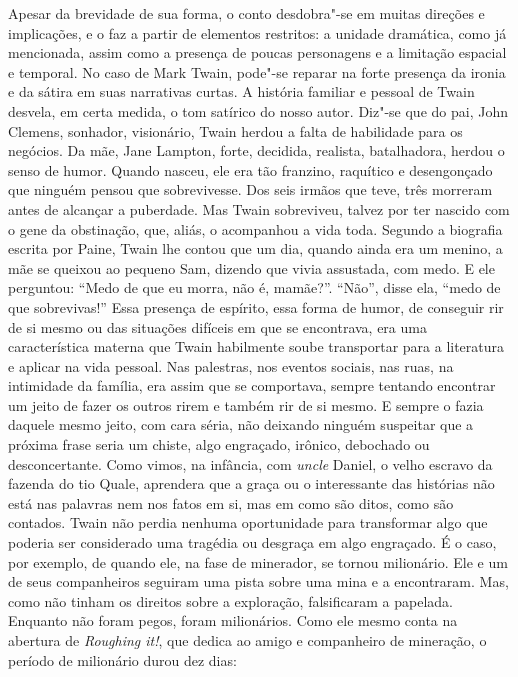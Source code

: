 Apesar da brevidade de sua forma, o conto desdobra"-se em muitas direções e implicações, e o faz a partir de elementos restritos: a unidade dramática, como já mencionada, assim como a presença de poucas personagens e a limitação espacial e temporal. No caso de Mark Twain, pode"-se reparar na forte presença da ironia e da sátira em suas narrativas curtas.
A história familiar e pessoal de Twain desvela, em certa medida, o tom satírico do nosso autor.
Diz"-se que do pai, John Clemens, sonhador, visionário, Twain herdou a
falta de habilidade para os negócios. Da mãe, Jane Lampton, forte,
decidida, realista, batalhadora, herdou o senso de humor. Quando nasceu,
ele era tão franzino, raquítico e desengonçado que ninguém pensou que
sobrevivesse. Dos seis irmãos que teve, três morreram antes de alcançar a
puberdade. Mas Twain sobreviveu, talvez por ter nascido com o gene da
obstinação, que, aliás, o acompanhou a vida toda. Segundo a biografia
escrita por Paine, Twain lhe contou que um dia, quando ainda era um menino, a mãe
se queixou ao pequeno Sam, dizendo que vivia assustada, com medo. E ele
perguntou: ``Medo de que eu morra, não é, mamãe?''. ``Não'', disse ela,
``medo de que sobrevivas!'' Essa presença de espírito, essa forma
de humor, de conseguir rir de si mesmo ou das
situações difíceis em que se encontrava, era uma característica materna
que Twain habilmente soube transportar para a literatura e
aplicar na vida pessoal. Nas palestras, nos eventos sociais, nas ruas, na
intimidade da família, era assim que se comportava, sempre tentando
encontrar um jeito de fazer os outros rirem e também rir de si mesmo. E sempre o
fazia daquele mesmo jeito, com cara séria, não deixando ninguém
suspeitar que a próxima frase seria um chiste, algo
engraçado, irônico, debochado ou desconcertante. Como vimos, na infância,
com \textit{uncle} Daniel, o velho escravo da fazenda do tio Quale, aprendera que a
graça ou o interessante das histórias não está nas palavras nem nos fatos
em si, mas em como são ditos, como são contados. Twain não perdia nenhuma
oportunidade para transformar algo que poderia ser considerado uma
tragédia ou desgraça em algo engraçado. É o caso, por exemplo, de quando
ele, na fase de minerador, se tornou milionário. Ele e um de seus
companheiros seguiram uma pista sobre uma mina e a encontraram. Mas, como
não tinham os direitos sobre a exploração, falsificaram a papelada.
Enquanto não foram pegos, foram milionários. Como ele mesmo conta na
abertura de \textit{Roughing it!}, que dedica ao amigo e companheiro de
mineração, o período de milionário durou dez dias:

